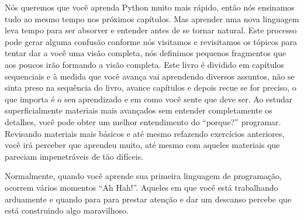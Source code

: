 Nós queremos que você aprenda Python muito mais rápido, então nós ensinamos tudo ao
mesmo tempo nos próximos capítulos.
Mas aprender uma nova linguagem leva tempo para ser absorver e entender antes de
se tornar natural.
Este processo pode gerar alguma confusão conforme nós visitamos e revisitamos os
tópicos para tentar dar a você uma visão completa, nós definimos pequenos
fragmentos que aos poucos irão formando a visão completa. Este livro é dividido
em capítulos sequenciais e à medida que você avança vai aprendendo diversos assuntos,
não se sinta preso na sequência do livro, avance capítulos e depois recue se for
preciso, o que importa é o seu aprendizado e em como você sente que deve ser.
Ao estudar superficialmente materiais mais avançados sem entender completamente
os detalhes, você pode obter um melhor entendimento do ``porque?'' programar.
Revisando materiais mais básicos e até mesmo refazendo exercícios anteriores,
você irá perceber que aprendeu muito, até mesmo com aqueles materiais que pareciam
impenetráveis de tão difíceis.
%

Normalmente, quando você aprende sua primeira linguagem de programação, ocorrem
vários momentos ``Ah Hah!''. Aqueles em que você está trabalhando arduamente
e quando para para prestar atenção e dar um descanso percebe que está construindo
algo maravilhoso.
%

